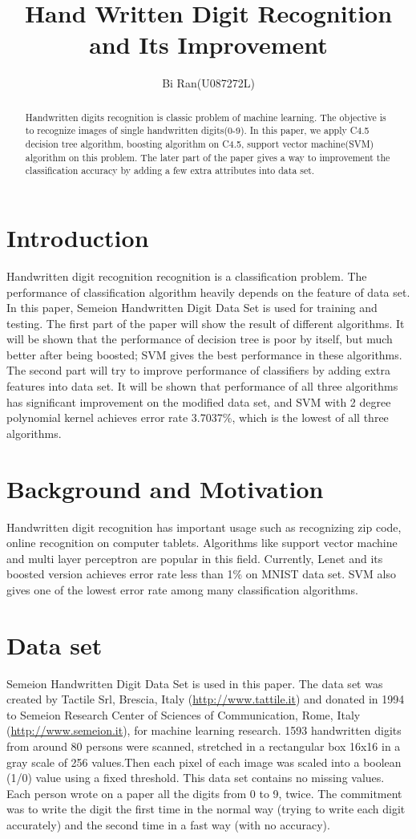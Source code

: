 \documentclass[a4paper,11pt]{article}
\author{Bi Ran(U087272L)}
\title{Hand Written Digit Recognition and Its Improvement}
\begin{document}
\maketitle
\begin{abstract}
Handwritten digits recognition is classic problem of machine learning. The objective is to recognize images of single handwritten digits(0-9). In this paper, we apply C4.5 decision tree algorithm, boosting algorithm on C4.5, support vector machine(SVM) algorithm on this problem. The later part of the paper gives a way to improvement the classification accuracy by adding a few extra attributes into data set.
\end{abstract}
\section{Introduction}
Handwritten digit recognition recognition is a classification problem. The performance of classification algorithm heavily depends on the feature of data set.
In this paper, Semeion Handwritten Digit Data Set is used for training and testing. The first part of the paper will show the result of different algorithms.
It will be shown that the performance of decision tree is poor by itself, but much better after being boosted; SVM gives the best performance in these algorithms.
The second part will try to improve performance of classifiers by adding extra features into data set. It will be shown that performance of all three algorithms
 has significant improvement on the modified data set, and SVM with 2 degree polynomial kernel achieves error rate 3.7037\%, which is the lowest of all three algorithms.
\section{Background and Motivation}
Handwritten digit recognition has important usage such as recognizing zip code, online recognition on computer tablets. Algorithms like support vector machine and multi layer perceptron are popular in this field. Currently, Lenet and its boosted version achieves error rate less than 1\% on MNIST data set. SVM also gives one of the lowest error rate among many classification algorithms.
\section{Data set}
Semeion Handwritten Digit Data Set is used in this paper. The data set was created by Tactile Srl, Brescia, Italy (\url{http://www.tattile.it}) and donated in 1994 to Semeion Research Center of Sciences of Communication, Rome, Italy (\url{http://www.semeion.it}), for machine learning research.
1593 handwritten digits from around 80 persons were scanned, stretched in a rectangular box 16x16 in a gray scale of 256 values.Then each pixel of each image was scaled into a boolean (1/0) value using a fixed threshold. This data set contains no missing values.
Each person wrote on a paper all the digits from 0 to 9, twice. The commitment was to write the digit the first time in the normal way (trying to write each digit accurately) and the second time in a fast way (with no accuracy).
\end{document}
